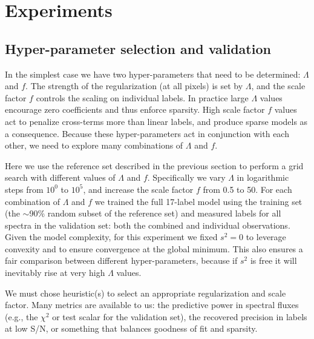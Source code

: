 \documentclass[12pt,preprint]{aastex}
\begin{document}
\section{Experiments}
\label{sec:experiments}


\subsection{Hyper-parameter selection and validation}
\label{sec:hyper-parameter-validation}


In the simplest case we have two hyper-parameters that need to be determined: 
$\Lambda$ and $f$.  The strength of the regularization (at all pixels) is set 
by $\Lambda$, and the scale factor $f$ controls the scaling on individual 
labels.  In practice large $\Lambda$ values encourage zero coefficients and thus enforce sparsity.  High scale factor $f$
values act to penalize cross-terms more than linear labels, and produce sparse
models as a consequence.  Because these hyper-parameters act in conjunction 
with each other, we need to explore many combinations of $\Lambda$ and $f$.


Here we use the reference set described in the previous section to perform a
grid search with different values of $\Lambda$ and $f$.  Specifically we vary 
$\Lambda$ in logarithmic steps from $10^0$ to $10^5$, and increase the 
scale factor $f$ from 0.5 to 50.  For each combination of $\Lambda$ and $f$ we 
trained the full 17-label model using the training set (the $\sim$90\% random
subset of the reference set) and measured labels for all spectra in the
validation set: both the combined and individual observations.  Given the model
complexity, for this experiment we fixed $s^2 = 0$ to leverage convexity
and to ensure convergence at the global minimum.  This also ensures a fair
comparison between different hyper-parameters, because if $s^2$ is free it
will inevitably rise at very high $\Lambda$ values.  


We must chose heuristic(s) to select an appropriate regularization and scale
factor.  Many metrics are available to us: the predictive power in spectral
fluxes (e.g., the $\chi^2$ or test scalar for the validation set), the 
recovered precision in labels at low S/N, or something that balances goodness of fit and sparsity.
\end{document}
